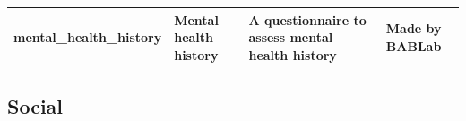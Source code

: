 \documentclass[]{book}
\begin{document}
\begin{longtable}[]{@{}llll@{}}
\begin{minipage}[t]{0.22\columnwidth}\raggedright
mental\_health\_history\strut
\end{minipage} & \begin{minipage}[t]{0.27\columnwidth}\raggedright
Mental health history\strut
\end{minipage} & \begin{minipage}[t]{0.22\columnwidth}\raggedright
A questionnaire to assess mental health history\strut
\end{minipage} & \begin{minipage}[t]{0.18\columnwidth}\raggedright
Made by BABLab\strut
\end{minipage}\tabularnewline
\bottomrule
\end{longtable}

\hypertarget{social}{%
\subsection{Social}\label{social}}
\end{document}

